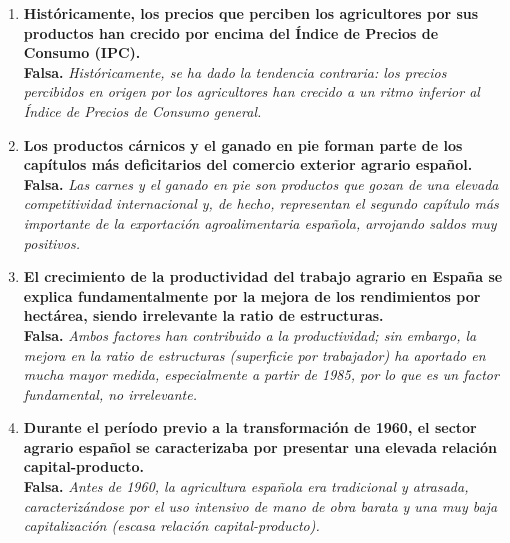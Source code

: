 \begin{enumerate}[label=\textbf{\arabic*.}]
    \item \textbf{Históricamente, los precios que perciben los agricultores por sus productos han crecido por encima del Índice de Precios de Consumo (IPC).} \\
    \textbf{Falsa.} \textit{Históricamente, se ha dado la tendencia contraria: los precios percibidos en origen por los agricultores han crecido a un ritmo inferior al Índice de Precios de Consumo general.}

    \item \textbf{Los productos cárnicos y el ganado en pie forman parte de los capítulos más deficitarios del comercio exterior agrario español.} \\
    \textbf{Falsa.} \textit{Las carnes y el ganado en pie son productos que gozan de una elevada competitividad internacional y, de hecho, representan el segundo capítulo más importante de la exportación agroalimentaria española, arrojando saldos muy positivos.}

    \item \textbf{El crecimiento de la productividad del trabajo agrario en España se explica fundamentalmente por la mejora de los rendimientos por hectárea, siendo irrelevante la ratio de estructuras.} \\
    \textbf{Falsa.} \textit{Ambos factores han contribuido a la productividad; sin embargo, la mejora en la ratio de estructuras (superficie por trabajador) ha aportado en mucha mayor medida, especialmente a partir de 1985, por lo que es un factor fundamental, no irrelevante.}

    \item \textbf{Durante el período previo a la transformación de 1960, el sector agrario español se caracterizaba por presentar una elevada relación capital-producto.} \\
    \textbf{Falsa.} \textit{Antes de 1960, la agricultura española era tradicional y atrasada, caracterizándose por el uso intensivo de mano de obra barata y una muy baja capitalización (escasa relación capital-producto).}

\end{enumerate}

